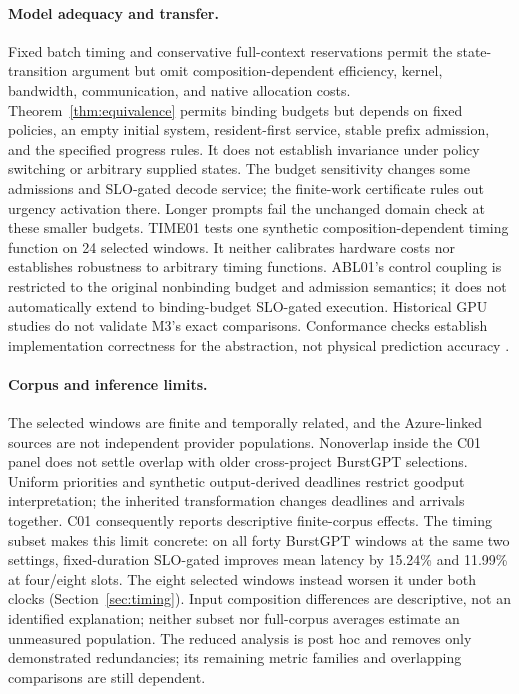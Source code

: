 \paragraph{Model adequacy and transfer.}
Fixed batch timing and conservative full-context reservations permit the
state-transition argument but omit composition-dependent efficiency,
kernel, bandwidth, communication, and native allocation costs. Theorem~\ref{thm:equivalence} permits binding budgets but depends on fixed
policies, an empty initial system, resident-first service, stable prefix
admission, and the specified progress rules. It does not establish
invariance under policy switching or arbitrary supplied states. The
budget sensitivity changes some admissions and SLO-gated decode service;
the finite-work certificate rules out urgency activation there. Longer
prompts fail the unchanged domain check at these smaller budgets.
TIME01 tests one synthetic composition-dependent timing function on
24 selected windows. It neither calibrates hardware costs nor establishes
robustness to arbitrary timing functions. ABL01's control coupling is
restricted to the original nonbinding budget and admission semantics;
it does not automatically extend to binding-budget SLO-gated execution.
Historical GPU studies do not validate M3's exact comparisons. Conformance checks establish implementation correctness
for the abstraction, not physical prediction accuracy \citep{sargent2013}.

\paragraph{Corpus and inference limits.}
The selected windows are finite and temporally related, and the Azure-linked
sources are not independent provider populations. Nonoverlap inside the C01
panel does not settle overlap with older cross-project BurstGPT selections.
Uniform priorities and synthetic output-derived deadlines restrict goodput
interpretation; the inherited transformation changes deadlines and arrivals
together. C01 consequently reports descriptive finite-corpus effects.
The timing subset makes this limit concrete: on all forty BurstGPT windows
at the same two settings, fixed-duration SLO-gated improves mean latency
by 15.24\% and 11.99\% at four/eight slots. The eight selected windows
instead worsen it under both clocks (Section~\ref{sec:timing}). Input
composition differences are descriptive, not an identified explanation;
neither subset nor full-corpus averages estimate an unmeasured population.
The reduced analysis is post hoc and removes only demonstrated redundancies;
its remaining metric families and overlapping comparisons are still dependent.

